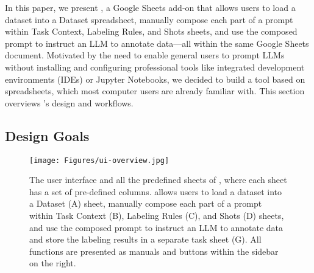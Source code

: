 

In this paper, we present \system, a Google Sheets add-on that allows users to load a dataset into a Dataset spreadsheet, manually compose each part of a prompt within Task Context, Labeling Rules, and Shots sheets, and use the composed prompt to instruct an LLM to annotate data---all within the same Google Sheets document.
Motivated by the need to enable general users to prompt LLMs without installing and configuring professional tools like integrated development environments (IDEs) or Jupyter Notebooks, we decided to build a tool based on spreadsheets, which most computer users are already familiar with.
This section overviews \system's design and workflows.

\subsection{Design Goals}\label{sec:3-system-design}


\begin{figure*}[t]
    \centering
    \texttt{[image: Figures/ui-overview.jpg]}
    \caption{The user interface and all the predefined sheets of \system, where each sheet has a set of pre-defined columns. 
    \system allows users to load a dataset into a Dataset (A) sheet, manually compose each part of a prompt within Task Context (B), Labeling Rules (C), and Shots (D) sheets, and use the composed prompt to instruct an LLM to annotate data and store the labeling results in a separate task sheet (G). All functions are presented as manuals and buttons within the sidebar on the right.}
    \label{fig:system-interface-ui-kenneth}
\end{figure*}

